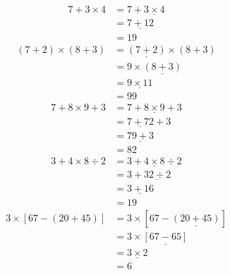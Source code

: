\documentclass[../Cours.tex]{subfiles}
\begin{document}
\begin{questions}
        \question 
        \begin{align*}
            7 + 3 \times 4 &= 7 + \underline{3 \times 4} \\
            &= \underline{7 + 12} \\
            &= 19
        \end{align*}
        \question
        \begin{align*}
            (7+2) \times (8+3) &= \underline{(7+2)} \times (8+3) \\
            &= 9 \times \underline{(8+3)} \\
            &= \underline{9 \times 11} \\
            &= 99
        \end{align*}
        \question
        \begin{align*}
            7 + 8 \times 9 + 3 &= 7 + \underline{8 \times 9} + 3 \\
            &= \underline{7 + 72} + 3 \\
            &= \underline{79 + 3} \\
            &= 82
        \end{align*}
        \question 
        \begin{align*}
            3 + 4 \times 8 \div 2 &= 3 + \underline{4 \times 8} \div 2 \\
            &= 3 + \underline{32 \div 2}\\
            &= \underline{3 + 16}\\
            &= 19
        \end{align*}
        \question
        \begin{align*}
            3 \times \left[ 67 - \left( 20 + 45 \right) \right] &= 3 \times \left[ 67 - \underline{\left( 20 + 45 \right)} \right] \\
            &= 3 \times \underline{\left[ 67 - 65 \right]} \\ 
            &= \underline{3 \times 2} \\
            &= 6
        \end{align*}
\end{questions}
\end{document}
